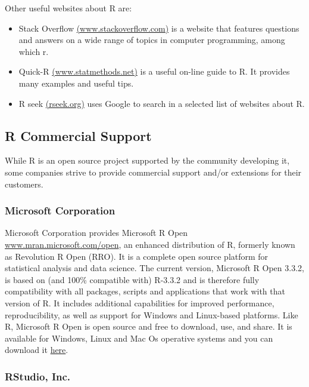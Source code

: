\documentclass[]{book}
\providecommand{\tightlist}{%
  \setlength{\itemsep}{0pt}\setlength{\parskip}{0pt}}
\def\tightlist{}
\begin{document}
Other useful websites about R are:

\begin{itemize}
\tightlist
\item
  Stack Overflow
  \href{http://stackoverflow.com/}{(www.stackoverflow.com)} is a website
  that features questions and answers on a wide range of topics in
  computer programming, among which r.
\item
  Quick-R \href{http://www.statmethods.net/}{(www.statmethods.net)} is a
  useful on-line guide to R. It provides many examples and useful tips.
\item
  R seek \href{http://rseek.org/}{(rseek.org)} uses Google to search in
  a selected list of websites about R.
\end{itemize}

\subsection{R Commercial Support}\label{r-commercial-support}

While R is an open source project supported by the community developing
it, some companies strive to provide commercial support and/or
extensions for their customers.

\subsubsection{Microsoft Corporation}\label{microsoft-corporation}

Microsoft Corporation provides Microsoft R Open
\href{https://mran.microsoft.com/open/}{www.mran.microsoft.com/open}, an
enhanced distribution of R, formerly known as Revolution R Open (RRO).
It is a complete open source platform for statistical analysis and data
science. The current version, Microsoft R Open 3.3.2, is based on (and
100\% compatible with) R-3.3.2 and is therefore fully compatibility with
all packages, scripts and applications that work with that version of R.
It includes additional capabilities for improved performance,
reproducibility, as well as support for Windows and Linux-based
platforms. Like R, Microsoft R Open is open source and free to download,
use, and share. It is available for Windows, Linux and Mac Os operative
systems and you can download it
\href{https://mran.microsoft.com/download/}{here}.

\subsubsection{RStudio, Inc.}\label{rstudio-inc.}
\end{document}
